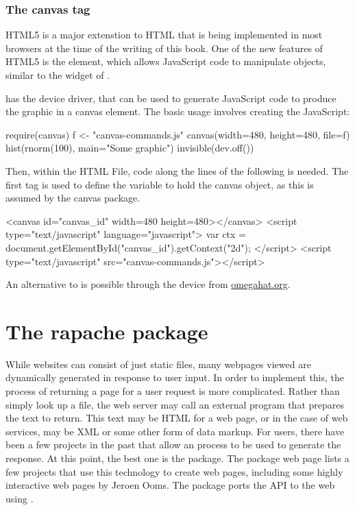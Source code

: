 \subsubsection{The canvas tag}
\label{sec:canvas-tag}
HTML5 is a major extenstion to HTML that is being implemented in most
browsers at the time of the writing of this book. One of the new
features of HTML5 is the  element, which allows
JavaScript code to manipulate objects, similar to the 
widget of . 

\R\/ has the  device driver, that can be used to generate
JavaScript code to produce the graphic in a canvas element. The basic
usage involves creating the JavaScript:
\begin{Schunk}
\begin{Sinput}
 require(canvas)
 f <- "canvas-commands.js"
 canvas(width=480, height=480, file=f)
 hist(rnorm(100), main="Some graphic")
 invisible(dev.off())
\end{Sinput}
\end{Schunk}

Then, within the HTML File, code along the lines of the following is
needed. The first  tag is used to define the variable
 to hold the canvas
object, as this is assumed by the canvas package. 

\begin{HTMLinput}
<canvas id="canvas_id" width=480 height=480></canvas>
<script type="text/javascript" language="javascript">
var ctx = document.getElementById("canvas_id").getContext("2d");
</script> 
<script type="text/javascript" src="canvas-commands.js"></script>
\end{HTMLinput}


An alternative to  is possible through the  device from \url{omegahat.org}.


\section{The rapache package}
\label{sec:calling-an-r}
While websites can consist of just static files, many webpages viewed
are dynamically generated in response to user input. In order to
implement this, the process of returning a page for a user request is
more complicated. Rather than simply look up a file, the web server
may call an external program that prepares the text to return. This
text may be HTML for a web page, or in the case of web services, may
be XML or some other form of data markup. For \R\/ users, there have
been a few projects in the past that allow an \R\/ process to be used
to generate the response. At this point, the best one is the
 package. The package web page lists a few projects that
use this technology to create web pages, including some highly
interactive web pages by Jeroen Ooms. The  package ports the
 API to the web using .


